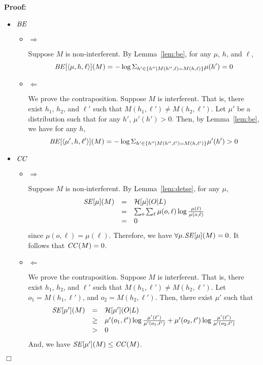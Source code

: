 \documentclass{llncs}
\newenvironment{proof}{\noindent\rm{\bf Proof:}}{\hbox{$\Box$}\vspace*{0.2\baselineskip}}
\newcommand{\aset}[1]{\{{#1}\}}
\newcommand{\aseq}[1]{\langle#1\rangle}
\begin{document}
\begin{proof}
\begin{itemize}
\item ${\it BE}$
\begin{itemize}
\item $\Rightarrow$

Suppose $M$ is non-interferent.  By Lemma~\ref{lem:be}, for any
$\mu$, $h$, and $\ell$,
\[
  {\it BE}[\aseq{\mu,h,\ell}](M)=-\log\Sigma_{h'\in
    \aset{h''\mid
      M(h'',\ell)=M(h,\ell)}}\mu(h')=0
\]
\item $\Leftarrow$

  We prove the contraposition. Suppose $M$ is interferent.  That is,
  there exist $h_1$, $h_2$, and $\ell'$ such that
  $M(h_1,\ell')\not=M(h_2,\ell')$.  Let $\mu'$ be a distribution such
  that for any $h'$, $\mu'(h')>0$.  Then, by Lemma~\ref{lem:be}, we
  have for any $h$,
\[
  {\it BE}[\aseq{\mu',h,\ell'}](M) =-\log\Sigma_{h'\in
    \aset{h''\mid
      M(h'',\ell')=M(h,\ell')}}\mu'(h')
  >0
\]
\end{itemize}

\item ${\it CC}$
\begin{itemize}
\item $\Rightarrow$

  Suppose $M$ is non-interferent.  By Lemma~\ref{lem:detse}, for any
  $\mu$,
\[
\begin{array}{rcl}
  {\it SE}[\mu](M)&=&\mathcal{H}[\mu](O|L)\\
  &=&\sum_o\sum_\ell \mu(o,\ell)\log\frac{\mu(\ell)}{\mu(o,\ell)}\\
  &=&0
\end{array}
\]
since $\mu(o,\ell)=\mu(\ell)$.  Therefore, we have $\forall\mu.{\it
  SE}[\mu](M)=0$.  It follows that ${\it CC}(M)=0$.
\item $\Leftarrow$

  We prove the contraposition. Suppose $M$ is interferent.  That is, there
  exist $h_1$, $h_2$, and $\ell'$ such that
  $M(h_1,\ell')\not=M(h_2,\ell')$.  Let $o_1=M(h_1,\ell')$, and
  $o_2=M(h_2,\ell')$.  Then, there exist $\mu'$ such that 
\[
\begin{array}{rcl}
  {\it SE}[\mu'](M)&=&\mathcal{H}[\mu'](O|L)\\
  &\ge&\mu'(o_1,\ell')\log\frac{\mu'(\ell')}{\mu'(o_1,\ell')}+\mu'(o_2,\ell')\log\frac{\mu'(\ell')}{\mu'(o_2,\ell')}\\
  &>&0
\end{array}
\]
And, we have ${\it SE}[\mu'](M)\le {\it CC}(M)$.
\end{itemize}

\end{itemize}
\end{proof}
\end{document}
